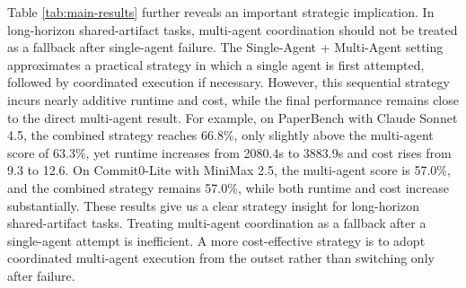 Table \ref{tab:main-results} further reveals an important strategic implication. In long-horizon shared-artifact tasks, multi-agent coordination should not be treated as a fallback after single-agent failure. The Single-Agent + Multi-Agent setting approximates a practical strategy in which a single agent is first attempted, followed by coordinated execution if necessary. However, this sequential strategy incurs nearly additive runtime and cost, while the final performance remains close to the direct multi-agent result. For example, on PaperBench with Claude Sonnet 4.5, the combined strategy reaches 66.8\%, only slightly above the multi-agent score of 63.3\%, yet runtime increases from 2080.4s to 3883.9s and cost rises from 9.3 to 12.6. On Commit0-Lite with MiniMax 2.5, the multi-agent score is 57.0\%, and the combined strategy remains 57.0\%, while both runtime and cost increase substantially. These results give us a clear strategy insight for long-horizon shared-artifact tasks. 
Treating multi-agent coordination as a fallback after a single-agent attempt is inefficient. A more cost-effective strategy is to adopt coordinated multi-agent execution from the outset rather than switching only after failure.








